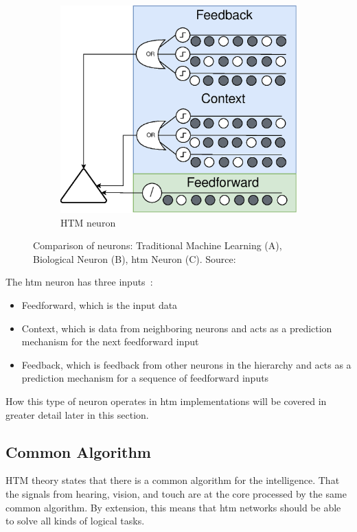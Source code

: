 \begin{figure}[H]
\begin{subfigure}[b]{0.55\linewidth}
        \includegraphics[width=\linewidth]{resources/related_works/neuron_htm}
        \caption[Comparison of neurons]{HTM neuron}
    \end{subfigure}
    \caption[Comparison of Neurons]{Comparison of neurons: Traditional Machine Learning (A), Biological Neuron (B), \gls*{htm} Neuron (C). Source:~\cite{BAMI}}
    \label{fig:neuron_comparison}
\end{figure}
The \gls*{htm} neuron has three inputs~\cite{htm_neurons}:
\begin{itemize}
    \item Feedforward, which is the input data
    \item Context, which is data from neighboring neurons and acts as a prediction mechanism for the next feedforward input
    \item Feedback, which is feedback from other neurons in the hierarchy and acts as a prediction mechanism for a sequence of feedforward inputs
\end{itemize}
How this type of neuron operates in \gls*{htm} implementations will be covered in greater detail later in this section.
\subsection{Common Algorithm}
HTM theory states that there is a common algorithm for the intelligence. That the signals from hearing, vision, and touch are at the core processed by the same common algorithm. By extension, this means that \gls*{htm} networks should be able to solve all kinds of logical tasks.

